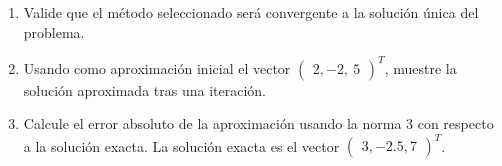 \documentclass[12pt]{article}
\begin{document}
\begin{enumerate}[leftmargin=*,widest=9]
\begin{enumerate}[label=\alph*]
   \item Valide que el método seleccionado será convergente a la solución única del problema.
   \item Usando como aproximación inicial el vector \( \begin{pmatrix} 2, -2, \ 5 \end{pmatrix}^T \), muestre la solución aproximada tras una iteración.
   \item Calcule el error absoluto de la aproximación usando la norma 3 con respecto a la solución exacta. La solución exacta es el vector
   \( \begin{pmatrix} 3, -2.5, 7 \end{pmatrix}^T \).
\end{enumerate}
   \end{enumerate}
\end{document}
